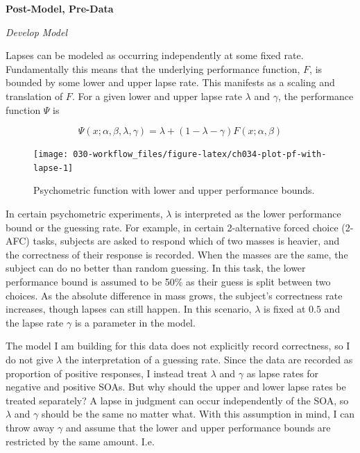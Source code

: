 \documentclass[11pt, oneside, openany]{scrbook}
\begin{document}
\textbf{Post-Model, Pre-Data}

\emph{Develop Model}

Lapses can be modeled as occurring independently at some fixed rate. Fundamentally this means that the underlying performance function, \(F\), is bounded by some lower and upper lapse rate. This manifests as a scaling and translation of \(F\). For a given lower and upper lapse rate \(\lambda\) and \(\gamma\), the performance function \(\Psi\) is


\[
\Psi(x; \alpha, \beta, \lambda, \gamma) = \lambda + (1 - \lambda - \gamma) F(x; \alpha, \beta)
\]

\begin{figure}

{\centering \texttt{[image: 030-workflow\_files/figure-latex/ch034-plot-pf-with-lapse-1]} 

}

\caption{Psychometric function with lower and upper performance bounds.}\label{fig:ch034-plot-pf-with-lapse}
\end{figure}

In certain psychometric experiments, \(\lambda\) is interpreted as the lower performance bound or the guessing rate. For example, in certain 2-alternative forced choice (2-AFC) tasks, subjects are asked to respond which of two masses is heavier, and the correctness of their response is recorded. When the masses are the same, the subject can do no better than random guessing. In this task, the lower performance bound is assumed to be 50\% as their guess is split between two choices. As the absolute difference in mass grows, the subject's correctness rate increases, though lapses can still happen. In this scenario, \(\lambda\) is fixed at \(0.5\) and the lapse rate \(\gamma\) is a parameter in the model.

The model I am building for this data does not explicitly record correctness, so I do not give \(\lambda\) the interpretation of a guessing rate. Since the data are recorded as proportion of positive responses, I instead treat \(\lambda\) and \(\gamma\) as lapse rates for negative and positive SOAs. But why should the upper and lower lapse rates be treated separately? A lapse in judgment can occur independently of the SOA, so \(\lambda\) and \(\gamma\) should be the same no matter what. With this assumption in mind, I can throw away \(\gamma\) and assume that the lower and upper performance bounds are restricted by the same amount. I.e.
\end{document}
